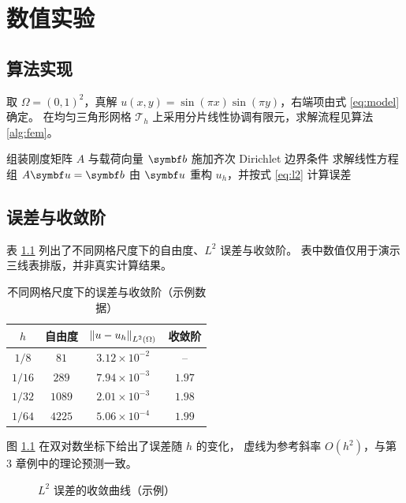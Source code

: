 \chapter{数值实验}

\section{算法实现}

取 $\Omega=(0,1)^2$，真解 $u(x,y)=\sin(\pi x)\sin(\pi y)$，右端项由式 \eqref{eq:model} 确定。
在均匀三角形网格 $\mathcal{T}_h$ 上采用分片线性协调有限元，求解流程见算法 \ref{alg:fem}。

\begin{algorithm}[htbp]
\caption{有限元求解流程（示例）}\label{alg:fem}
组装刚度矩阵 $A$ 与载荷向量 $\vect{b}$\;
施加齐次 Dirichlet 边界条件\;
求解线性方程组 $A\vect{u}=\vect{b}$\;
由 $\vect{u}$ 重构 $u_h$，并按式 \eqref{eq:l2} 计算误差\;
\end{algorithm}

\section{误差与收敛阶}

表 \ref{tab:error} 列出了不同网格尺度下的自由度、$L^2$ 误差与收敛阶。
表中数值仅用于演示三线表排版，并非真实计算结果。

\begin{table}[htbp]
\centering
\caption{不同网格尺度下的误差与收敛阶（示例数据）}\label{tab:error}
\begin{tabular}{cccc}
\toprule
$h$ & 自由度 & $\left\lVert u-u_h\right\rVert_{L^2(\Omega)}$ & 收敛阶 \\
\midrule
$1/8$   & $81$   & $3.12\times10^{-2}$ & --   \\
$1/16$  & $289$  & $7.94\times10^{-3}$ & $1.97$ \\
$1/32$  & $1089$ & $2.01\times10^{-3}$ & $1.98$ \\
$1/64$  & $4225$ & $5.06\times10^{-4}$ & $1.99$ \\
\bottomrule
\end{tabular}
\end{table}

图 \ref{fig:conv} 在双对数坐标下给出了误差随 $h$ 的变化，
虚线为参考斜率 $O(h^2)$，与第 3 章例中的理论预测一致。

\begin{figure}[htbp]
\centering
{}
\caption{$L^2$ 误差的收敛曲线（示例）}\label{fig:conv}
\end{figure}

